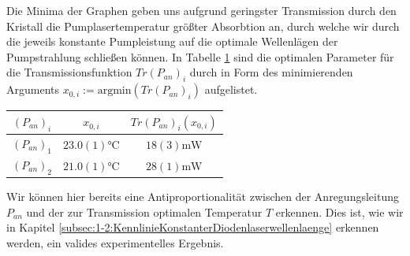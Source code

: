 \documentclass[../../main.tex]{subfiles}
\begin{document}
    Die Minima der Graphen geben uns aufgrund geringster Transmission durch den Kristall die Pumplasertemperatur größter Absorbtion an, durch welche wir durch die jeweils konstante Pumpleistung auf die optimale Wellenlägen der Pumpstrahlung schließen können. In Tabelle \ref{tab:1-1:OptimaleParameterSpektrum} sind die optimalen Parameter für die Transmissionsfunktion $\textit{Tr}(P_{\textit{an}})_i$ durch in Form des minimierenden Arguments $x_{0,i}:=\text{argmin}(\textit{Tr}(P_{\textit{an}})_i)$ aufgelistet. 
    \begin{table}[H]
        \centering
        \begin{tabular}{c|cc}
            \hline
            $(P_{\textit{an}})_i$ & $x_{0,i}$ & $\textit{Tr}(P_{\textit{an}})_i(x_{0,i})$ \\
            \hline\hline
            $(P_{\textit{an}})_1$ & $23.0(1)\si{\celsius}$ & $18(3)\si{\mW}$ \\
            $(P_{\textit{an}})_2$ & $21.0(1)\si{\celsius}$ & $28(1)\si{\mW}$ \\
        \end{tabular}
        \label{tab:1-1:OptimaleParameterSpektrum}
    \end{table}
    Wir können hier bereits eine Antiproportionalität zwischen der Anregungsleitung $P_{\textit{an}}$ und der zur Transmission optimalen Temperatur $T$ erkennen. Dies ist, wie wir in Kapitel \ref{subsec:1-2:KennlinieKonstanterDiodenlaserwellenlaenge} erkennen werden, ein valides experimentelles Ergebnis.
\end{document}
